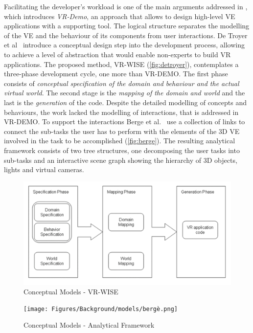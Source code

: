 Facilitating the developer's workload is one of the main arguments addressed in \cite{coninx_vr-demo_2006}, which introduces \textit{VR-Demo}, an approach that allows to design high-level \gls{VE} applications with a supporting tool. The logical structure separates the modelling of the VE and the behaviour of its components from user interactions. De Troyer et al~\cite{de_troyer_conceptual_2007} introduce a conceptual design step into the development process, allowing to achieve a level of abstraction that would enable non-experts to build VR applications. The proposed method, VR-WISE (\autoref{fig:detroyer}), contemplates a three-phase development cycle, one more than VR-DEMO. The first phase consists of \textit{conceptual specification of the domain and behaviour and the actual virtual world}. The second stage is the \textit{mapping of the domain and world} and the last is the \textit{generation} of the code. Despite the detailed modelling of concepts and behaviours, the work lacked the modelling of interactions, that is addressed in VR-DEMO. To support the interactions Berge et al.~\cite{berge_towards_2014} use a collection of links to connect the sub-tasks the user has to perform with the elements of the 3D VE involved in the task to be accomplished (\autoref{fig:berge}). The resulting analytical framework consists of two tree structures, one decomposing the user tasks into sub-tasks and an interactive scene graph showing the hierarchy of 3D objects, lights and virtual cameras. 

\begin{figure}[h]
    \centering
    \includegraphics[width=\textwidth]{Figures/Background/models/detroyer.png}
    \caption{Conceptual Models - VR-WISE}
    \label{fig:detroyer}
\end{figure}

\begin{figure}[h]
    \centering
    \texttt{[image: Figures/Background/models/bergè.png]}
    \caption{Conceptual Models - Analytical Framework}
    \label{fig:berge}
\end{figure}

